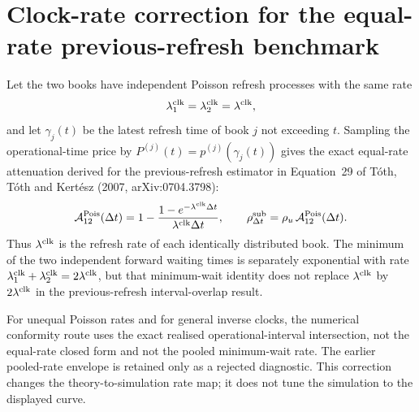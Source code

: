 
\section*{Clock-rate correction for the equal-rate previous-refresh benchmark}

Let the two books have independent Poisson refresh processes with the same
rate
\[
  \lambda_1^{\rm clk}=\lambda_2^{\rm clk}=\lambda^{\rm clk},
\]
and let $\gamma_j(t)$ be the latest refresh time of book $j$ not exceeding
$t$.  Sampling the operational-time price by
$P^{(j)}(t)=p^{(j)}(\gamma_j(t))$ gives the exact equal-rate attenuation
derived for the previous-refresh estimator in Equation~29 of T\'{o}th,
T\'{o}th and Kert\'{e}sz (2007, arXiv:0704.3798):
\[
  \mathcal A_{12}^{\rm Pois}(\Delta t)
  =1-\frac{1-e^{-\lambda^{\rm clk}\Delta t}}
           {\lambda^{\rm clk}\Delta t},
  \qquad
  \rho_{\Delta t}^{\rm sub}
  =\rho_u\,\mathcal A_{12}^{\rm Pois}(\Delta t).
\]
Thus $\lambda^{\rm clk}$ is the refresh rate of each identically
distributed book.  The minimum of the two independent forward waiting times
is separately exponential with rate
$\lambda_1^{\rm clk}+\lambda_2^{\rm clk}=2\lambda^{\rm clk}$, but that
minimum-wait identity does not replace $\lambda^{\rm clk}$ by
$2\lambda^{\rm clk}$ in the previous-refresh interval-overlap result.

For unequal Poisson rates and for general inverse clocks, the numerical
conformity route uses the exact realised operational-interval intersection,
not the equal-rate closed form and not the pooled minimum-wait rate.  The
earlier pooled-rate envelope is retained only as a rejected diagnostic.  This
correction changes the theory-to-simulation rate map; it does not tune the
simulation to the displayed curve.

